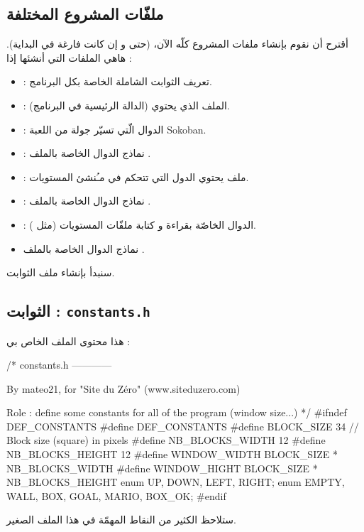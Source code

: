 \subsection{ملفّات المشروع المختلفة}

أقترح أن نقوم بإنشاء ملفات المشروع كلّه الآن، (حتى و إن كانت فارغة في البداية). هاهي الملفات التي أنشئها إذا :
\begin{itemize}
	\item {} :
	تعريف الثوابت الشاملة الخاصة بكل البرنامج.
	\item {} :
	الملف الذي يحتوي
	(الدالة الرئيسية في البرنامج).
	\item {} :
	الدوال الّتي تسيّر جولة من اللعبة 
	\textenglish{Sokoban}.
	\item {} :
	نماذج الدوال الخاصة بالملف 
	.
	\item {} :
	ملف يحتوي الدول التي تتحكم في مـُنشئ المستويات.
	\item {} :
	نماذج الدوال الخاصة بالملف 
	.
	\item {} :
	الدوال الخاصّة بقراءة و كتابة ملفّات المستويات (مثل
	).
	\item نماذج الدوال الخاصة بالملف 
	.
\end{itemize}
سنبدأ بإنشاء ملف الثوابت.

\subsection{الثوابت : \texttt{constants.h}}

هذا محتوى الملف
الخاص بي :

\begin{Csource}
/*
constants.h
------------

By mateo21, for "Site du Zéro" (www.siteduzero.com)

Role : define some constants for all of the program (window size...)
*/
#ifndef DEF_CONSTANTS
#define DEF_CONSTANTS
#define BLOCK_SIZE 34 // Block size (square) in pixels
#define NB_BLOCKS_WIDTH 12
#define NB_BLOCKS_HEIGHT 12
#define WINDOW_WIDTH BLOCK_SIZE * NB_BLOCKS_WIDTH
#define WINDOW_HIGHT BLOCK_SIZE * NB_BLOCKS_HEIGHT
enum {UP, DOWN, LEFT, RIGHT};
enum {EMPTY, WALL, BOX, GOAL, MARIO, BOX_OK};
#endif
\end{Csource}

ستلاحظ الكثير من النقاط المهمّة في هذا الملف الصغير.

